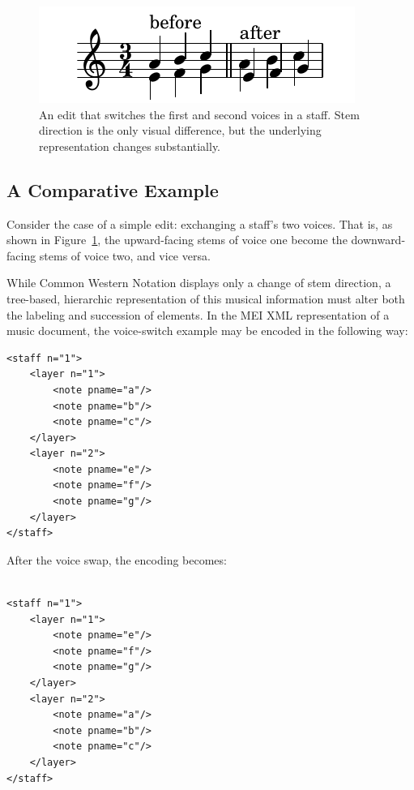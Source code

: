 \documentclass{article}
\begin{document}
\begin{figure}[!htb]
\centering
\includegraphics[width=0.7\columnwidth]{layers.pdf}
\caption{An edit that switches the first and second voices in a staff. Stem direction is the only visual difference, but the underlying representation changes substantially.}
\label{fig:voice_swap}
\end{figure}

\subsection{A Comparative Example}
Consider the case of a simple edit: exchanging a staff's two voices.
That is, as shown in Figure~\ref{fig:voice_swap}, the upward-facing
stems of voice one become the downward-facing stems of voice two, and
vice versa.

While Common Western Notation displays only a change of stem
direction, a tree-based, hierarchic representation of this musical
information must alter both the labeling and succession of elements.
In the MEI XML representation of a music document, the voice-switch
example may be encoded in the following way:


\begin{verbatim}
<staff n="1"> 
    <layer n="1">
        <note pname="a"/>
        <note pname="b"/>
        <note pname="c"/>
    </layer>
    <layer n="2">
        <note pname="e"/>
        <note pname="f"/>
        <note pname="g"/>
    </layer>
</staff>
\end{verbatim}

After the voice swap, the encoding becomes:

\begin{verbatim}

<staff n="1">
    <layer n="1">
        <note pname="e"/>
        <note pname="f"/>
        <note pname="g"/>
    </layer>
    <layer n="2">
        <note pname="a"/>
        <note pname="b"/>
        <note pname="c"/>
    </layer>
</staff>
\end{verbatim}
\end{document}
